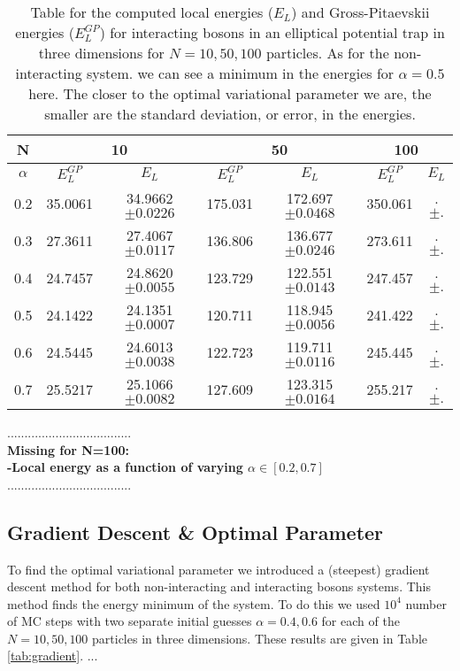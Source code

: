 \documentclass[12pt,a4paper,english]{article}
\begin{document}
\begin{table}[htbp!]
	\centering
	\begin{tabular}{ |c|c|c|c|c|c|c| }
		\hline \rule{0pt}{13pt}
		N & \multicolumn{2}{c|}{10} & \multicolumn{2}{c|}{50} & \multicolumn{2}{c|}{100}\\
		\hline \rule{0pt}{13pt}
		$\alpha$ & $E_L^{GP}$ & $E_L$ & $E_L^{GP}$ & $E_L$ & $E_L^{GP}$ & $E_L$ \\
		\hline \rule{0pt}{13pt}
		0.2 & 35.0061 & 34.9662$\pm0.0226$ & 175.031 & 172.697$\pm0.0468$ & 350.061 & .$\pm.$ \\
		\hline \rule{0pt}{13pt}
		0.3 & 27.3611 & 27.4067$\pm0.0117$ & 136.806 & 136.677$\pm0.0246$ & 273.611 & .$\pm.$ \\
		\hline \rule{0pt}{13pt}
		0.4 & 24.7457 & 24.8620$\pm0.0055$ & 123.729 & 122.551$\pm0.0143$ & 247.457 & .$\pm.$ \\
		\hline \rule{0pt}{13pt}
		0.5 & 24.1422 & 24.1351$\pm0.0007$ & 120.711 & 118.945$\pm0.0056$ & 241.422 & .$\pm.$ \\
		\hline \rule{0pt}{13pt}
		0.6 & 24.5445 & 24.6013$\pm0.0038$ & 122.723 & 119.711$\pm0.0116$ & 245.445 & .$\pm.$ \\
		\hline \rule{0pt}{13pt}
		0.7 & 25.5217 & 25.1066$\pm0.0082$ & 127.609 & 123.315$\pm0.0164$ & 255.217 & .$\pm.$ \\
		\hline
	\end{tabular}	
	\caption{Table for the computed local energies ($E_L$) and Gross-Pitaevskii energies ($E_L^{GP}$) for interacting bosons in an elliptical potential trap in three dimensions for $N=10,50,100$ particles. As for the non-interacting system. we can see a minimum in the energies for $\alpha=0.5$ here. The closer to the optimal variational parameter we are, the smaller are the standard deviation, or error, in the energies.  \label{tab:alpha_int}}
\end{table}

....................................\\
\textbf{Missing for N=100:\\
-Local energy as a function of varying $\alpha\in[0.2,0.7]$}\\
....................................

\subsection{Gradient Descent \& Optimal Parameter}
\label{subsect:Result_gradient}
To find the optimal variational parameter we introduced a (steepest) gradient descent method for both non-interacting and interacting bosons systems. This method finds the energy minimum of the system. To do this we used $10^4$ number of MC steps with two separate initial guesses $\alpha=0.4, 0.6$ for each of the $N=10,50,100$ particles in three dimensions. These results are given in Table \ref{tab:gradient}. ... 
\end{document}
